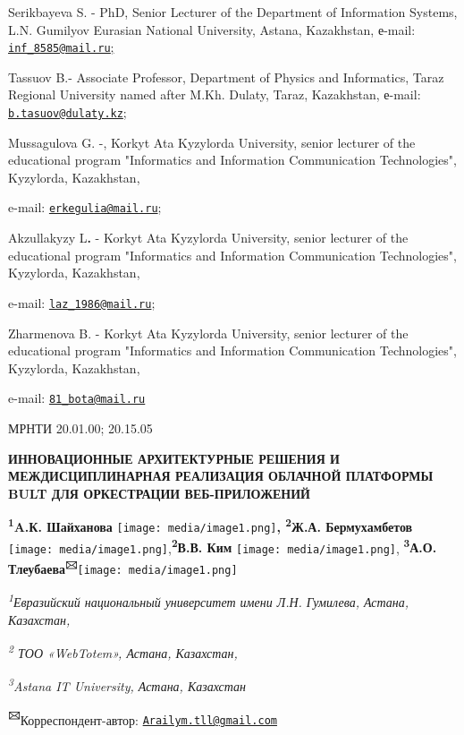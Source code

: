 \documentclass[
]{article}
\begin{document}
Serikbayeva S. - PhD, Senior Lecturer of the Department of Information
Systems, L.N. Gumilyov Eurasian National University, Astana, Kazakhstan,
е-mail:
\ul{\href{mailto:inf_8585@mail.ru}{\nolinkurl{inf\_8585@mail.ru}};}

Tassuov B.- Associate Professor, Department of Physics and Informatics,
Taraz Regional University named after M.Kh. Dulaty, Taraz, Kazakhstan,
е-mail:
\href{mailto:b.tasuov@dulaty.kz}{\nolinkurl{b.tasuov@dulaty.kz}};

Mussagulova G. -, Korkyt Ata Kyzylorda University, senior lecturer of
the educational program "Informatics and Information Communication
Technologies", Kyzylorda, Kazakhstan,

e-mail: \href{mailto:erkegulia@mail.ru}{\nolinkurl{erkegulia@mail.ru}};

Akzullakyzy L\textbf{.} - Korkyt Ata Kyzylorda University, senior
lecturer of the educational program "Informatics and Information
Communication Technologies", Kyzylorda, Kazakhstan,

e-mail: \href{mailto:laz_1986@mail.ru}{\nolinkurl{laz\_1986@mail.ru}};

Zharmenova B. - Korkyt Ata Kyzylorda University, senior lecturer of the
educational program "Informatics and Information Communication
Technologies", Kyzylorda, Kazakhstan,

e-mail: \href{mailto:81_bota@mail.ru}{\nolinkurl{81\_bota@mail.ru}}

МРНТИ 20.01.00; 20.15.05

\textbf{ИННОВАЦИОННЫЕ АРХИТЕКТУРНЫЕ РЕШЕНИЯ И МЕЖДИСЦИПЛИНАРНАЯ
РЕАЛИЗАЦИЯ ОБЛАЧНОЙ ПЛАТФОРМЫ BULT ДЛЯ ОРКЕСТРАЦИИ ВЕБ-ПРИЛОЖЕНИЙ}

\textbf{\textsuperscript{1}A.К. Шайханова}
\texttt{[image: media/image1.png]}\textbf{,
\textsuperscript{2}Ж.А. Бермухамбетов}
\texttt{[image: media/image1.png]},\textbf{\textsuperscript{2}В.В.
Ким} \texttt{[image: media/image1.png]},
\textbf{\textsuperscript{3}А.О.
Тлеубаева\textsuperscript{🖂}}\texttt{[image: media/image1.png]}

\emph{\textsuperscript{1}Евразийский национальный университет имени Л.Н.
Гумилева, Астана, Казахстан,}

\emph{\textsuperscript{2} ТОО «WebTotem», Астана, Казахстан,}

\emph{\textsuperscript{3}Astana IT University, Астана, Казахстан}

\textbf{\textsuperscript{🖂}}Корреспондент-автор:
\href{mailto:Arailym.tll@gmail.com}{\nolinkurl{Arailym.tll@gmail.com}}
\end{document}
